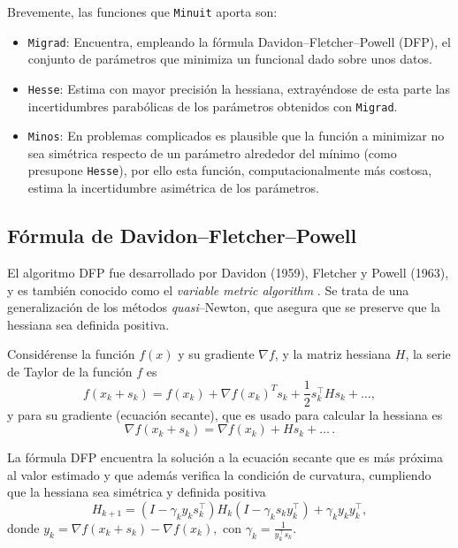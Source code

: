 Brevemente, las funciones que \texttt{Minuit} aporta son:
\begin{itemize}
  \item \texttt{Migrad}: Encuentra, empleando la fórmula Davidon–Fletcher–Powell (DFP), el conjunto de parámetros que minimiza un funcional dado sobre unos datos.
  \item \texttt{Hesse}: Estima con mayor precisión la hessiana, extrayéndose de esta parte las incertidumbres parabólicas de los parámetros obtenidos con \texttt{Migrad}.   
  \item \texttt{Minos}: En problemas complicados es plausible que la función a minimizar no sea simétrica respecto de un parámetro alrededor del mínimo (como presupone \texttt{Hesse}), por ello esta función, computacionalmente más costosa, estima la incertidumbre asimétrica de los parámetros.
\end{itemize}



\subsection{Fórmula de Davidon--Fletcher--Powell}

El algoritmo DFP fue desarrollado por Davidon (1959), Fletcher y Powell (1963), y es también conocido como el \emph{variable metric algorithm} \cite{fletcher1963rapidly}. Se trata de una generalización de los métodos \textit{quasi}--Newton, que asegura que se preserve que la hessiana sea definida positiva.

Considérense la función $f(x)$ y su gradiente $\nabla f$, y la matriz hessiana $H$, la serie de Taylor de la función $f$ es \cite{fletcher2000practical}
\begin{equation}
  f(x_k+s_k) = f(x_k) + \nabla f(x_k)^T s_k + \frac{1}{2} s_k^{\top} {H} s_k + \dots,
\end{equation}
y para su gradiente (ecuación secante), que es usado para calcular la hessiana es
\[\nabla f(x_k+s_k) = \nabla f(x_k) + H s_k + \dots\,.\]
  

La fórmula DFP encuentra la solución a la ecuación secante que es más próxima al valor estimado y que además verifica la condición de curvatura, cumpliendo que la hessiana sea simétrica y definida positiva
\begin{equation}
  H_{k+1}=
(I - \gamma_k y_k s_k^{\top}) H_k (I - \gamma_k s_k y_k^{\top}) + \gamma_k y_k y_k^{\top},
\end{equation}
donde $y_k = \nabla f(x_k+s_k) - \nabla f(x_k),$ con 
$\gamma_k = \frac{1}{y_k^{\top} s_k}$.

